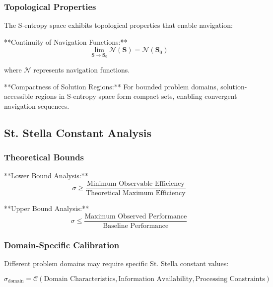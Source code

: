 \documentclass[12pt,a4paper]{article}
\begin{document}
\subsubsection{Topological Properties}

The S-entropy space exhibits topological properties that enable navigation:

**Continuity of Navigation Functions:**
\begin{equation}
\lim_{\mathbf{S} \to \mathbf{S}_0} \mathcal{N}(\mathbf{S}) = \mathcal{N}(\mathbf{S}_0)
\label{eq:navigation_continuity}
\end{equation}

where $\mathcal{N}$ represents navigation functions.

**Compactness of Solution Regions:**
For bounded problem domains, solution-accessible regions in S-entropy space form compact sets, enabling convergent navigation sequences.

\subsection{St. Stella Constant Analysis}

\subsubsection{Theoretical Bounds}

**Lower Bound Analysis:**
\begin{equation}
\sigma \geq \frac{\text{Minimum Observable Efficiency}}{\text{Theoretical Maximum Efficiency}}
\label{eq:stella_lower_bound}
\end{equation}

**Upper Bound Analysis:**
\begin{equation}
\sigma \leq \frac{\text{Maximum Observed Performance}}{\text{Baseline Performance}}
\label{eq:stella_upper_bound}
\end{equation}

\subsubsection{Domain-Specific Calibration}

Different problem domains may require specific St. Stella constant values:

\begin{equation}
\sigma_{\text{domain}} = \mathcal{C}(\text{Domain Characteristics}, \text{Information Availability}, \text{Processing Constraints})
\label{eq:domain_specific_stella}
\end{equation}
\end{document}

